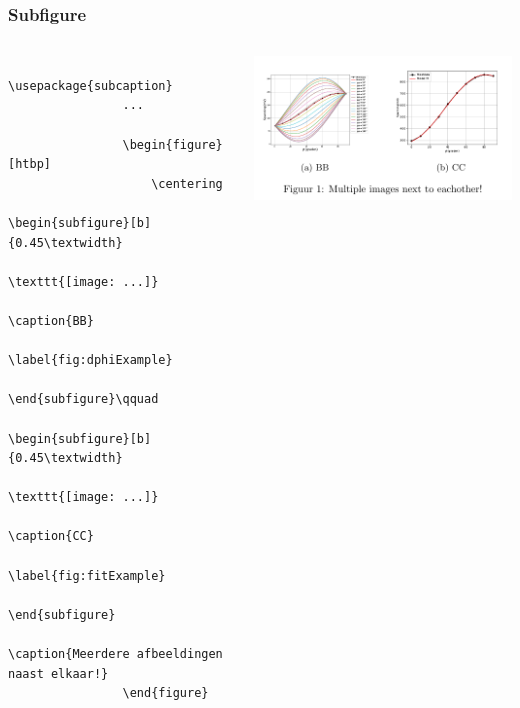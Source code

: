 \begin{frame}[fragile]
    \frametitle{Subfigure}%
    \begin{columns}
        \begin{column}{0.4\textwidth}
            \begin{verbatim}
                \usepackage{subcaption}
                ...

                \begin{figure}[htbp]
                    \centering
                    \begin{subfigure}[b]{0.45\textwidth}
                        \texttt{[image: ...]}
                        \caption{BB}
                        \label{fig:dphiExample}
                    \end{subfigure}\qquad
                    \begin{subfigure}[b]{0.45\textwidth}
                        \texttt{[image: ...]}
                        \caption{CC}
                        \label{fig:fitExample}
                    \end{subfigure}
                    \caption{Meerdere afbeeldingen naast elkaar!}
                \end{figure}
            \end{verbatim}
        \end{column}
        \begin{column}{0.6\textwidth}
            \begin{adjustbox}{frame=1pt 10pt}%
                \begin{minipage}{\textwidth-22pt}
            \includegraphics[width=\textwidth,height=0.8\textheight,keepaspectratio]{assets/outdir/subfigure}
                \end{minipage}
            \end{adjustbox}
        \end{column}
    \end{columns}
\end{frame}

